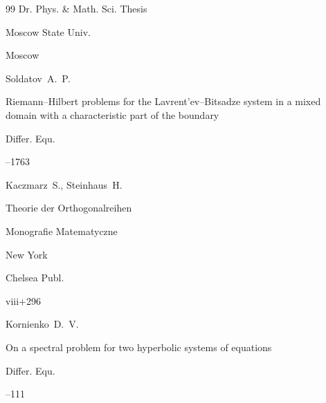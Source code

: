 \begin{thebibliography}{99}
\thesisinfo Dr. Phys. \& Math. Sci. Thesis


\publ Moscow State Univ.

\publaddr Moscow 








\by Soldatov~A.~P. 

\paper Riemann--Hilbert problems for the Lavrent'ev--Bitsadze system in a mixed domain with a characteristic part of the boundary


\jour Differ. Equ.




--1763









\by Kaczmarz~S., Steinhaus~H.

\book Theorie der Orthogonalreihen


\serial Monografie Matematyczne 


\publaddr New York

\publ Chelsea Publ. 

\totalpages viii+296 





\by Kornienko~D.~V.

\paper On a spectral problem for two hyperbolic systems of equations


\jour Differ. Equ.




--111




\end{thebibliography}









%

